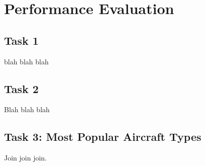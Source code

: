 \documentclass[12pt]{article}
\begin{document}
\section*{Performance Evaluation}
\subsection*{Task 1}
blah blah blah
\subsection*{Task 2}
Blah blah blah 
\subsection*{Task 3: Most Popular Aircraft Types}
Join join join.
\newpage{}
\end{document}
